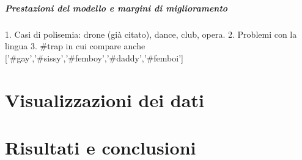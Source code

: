 \documentclass[12pt, a4paper, twocolumn]{article} %
\begin{document}
\subsubsection{Prestazioni del modello e margini di miglioramento}
1. Casi di polisemia: drone (già citato), dance, club, opera. 
2. Problemi con la lingua
3. #trap in cui compare anche ['#gay','#sissy','#femboy','#daddy','#femboi'] 

\hfill
\newpage
\part{Visualizzazioni dei dati}

\hfill
\newpage
\part{Risultati e conclusioni}




\hfill
\newpage
\printbibliography[title={Bibliografia}]

\end{document}
